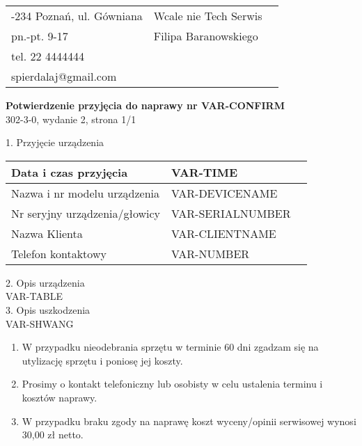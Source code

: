 \documentclass{article}
\begin{document}
\begin{tabularx}{\textwidth} {
   >{\raggedright\arraybackslash}X
   >{\centering\arraybackslash}X
   >{\raggedleft\arraybackslash}X  }

61-234 Poznań, ul. Gówniana & \hspace{4mm} Wcale nie Tech Serwis \\
pn.-pt. 9-17 & \hspace{4mm}  Filipa Baranowskiego\\
tel. 22 4444444 &\\
spierdalaj@gmail.com &\\
\end{tabularx}


\begin{center}
\textbf{Potwierdzenie przyjęcia do naprawy nr VAR-CONFIRM} \\
302-3-0, wydanie 2, strona 1/1\\
\end{center}

1. Przyjęcie urządzenia\\
\begin{tabularx}{\textwidth} {
  | >{\raggedright\arraybackslash}X
  | >{\centering\arraybackslash}X
  | >{\raggedleft\arraybackslash}X | }
\hline
 Data i czas przyjęcia & VAR-TIME \\
\hline
 Nazwa i nr modelu urządzenia & VAR-DEVICENAME  \\
\hline
 Nr seryjny urządzenia/głowicy & VAR-SERIALNUMBER   \\
\hline
Nazwa Klienta & VAR-CLIENTNAME \\
\hline
Telefon kontaktowy & VAR-NUMBER \\
\hline
\end{tabularx}\vspace{2mm}
2. Opis urządzenia \\
\vspace{2mm}
VAR-TABLE
\vspace{1mm} \\
3. Opis uszkodzenia \\
\vspace{2mm}
VAR-SHWANG
\vspace{10mm}
\begin{footnotesize}
\begin{enumerate}
\item W przypadku nieodebrania sprzętu w terminie 60 dni zgadzam się na utylizację sprzętu i poniosę jej koszty.\\
\item Prosimy o kontakt telefoniczny lub osobisty w celu ustalenia terminu i kosztów naprawy.\\
\item W przypadku braku zgody na naprawę koszt wyceny/opinii serwisowej wynosi 30,00 zł netto.
\end{enumerate}
\end{footnotesize} \vspace{3mm}
\end{document}
